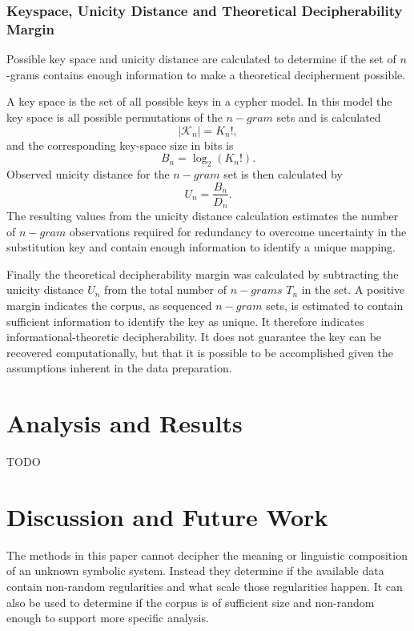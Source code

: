 \documentclass[preprint,12pt]{elsarticle}
\begin{document}
\subsubsection{Keyspace, Unicity Distance and Theoretical Decipherability Margin}
Possible key space and unicity distance are calculated to determine if the set of \(n\)-grams contains enough information to make a theoretical decipherment possible. 

A key space is the set of all possible keys in a cypher model. In this model the key space is all possible permutations of the \(n-gram\) sets and is calculated 
\[
|\mathcal{K}_n| = K_n!,
\]and the corresponding key-space size in bits is
\[
B_n = \log_2(K_n!).
\]
Observed unicity distance for the \(n-gram\) set is then calculated by 
\[
U_n = \frac{B_n}{D_n}.
\]
The resulting values from the unicity distance calculation estimates the number of \(n-gram\) observations required for redundancy to overcome uncertainty in the substitution key and contain enough information to identify a unique mapping. 

Finally the theoretical decipherability margin was calculated by subtracting the unicity distance \(U_n\) from the total number of \(n-grams\) \(T_n\) in the set. A positive margin indicates the corpus, as sequenced \(n-gram\) sets, is estimated to contain sufficient information to identify the key as unique. It therefore indicates informational-theoretic decipherability. It does not guarantee the key can be recovered computationally, but that it is possible to be accomplished given the assumptions inherent in the data preparation. 

\section{Analysis and Results} 
\label{anal_results}
TODO
\section{Discussion and Future Work}
\label{discussion}

The methods in this paper cannot decipher the meaning or linguistic composition of an unknown symbolic system. Instead they determine if the available data contain non-random regularities and what scale those regularities happen. It can also be used to determine if the corpus is of sufficient size and non-random enough to support more specific analysis. 
\end{document}
